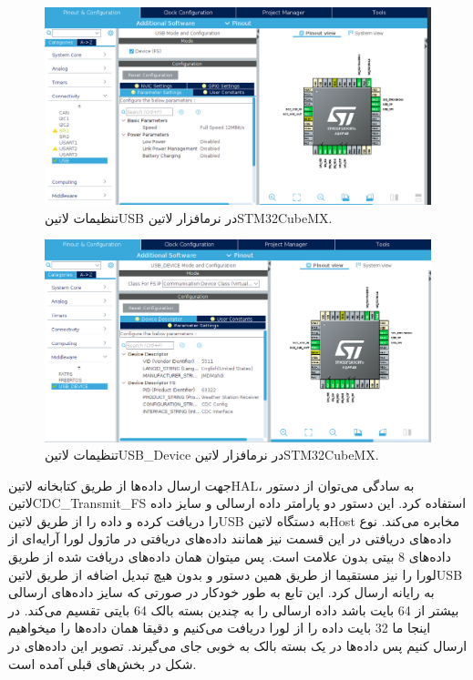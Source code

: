 \begin{figure}[H]
	\centering
	\includegraphics[width=\linewidth]{Assets/usb.png}
	\caption{تنظیمات ‌لاتین{USB} در نرمافزار ‌لاتین{STM32CubeMX}.}
	\label{fig:usb}
\end{figure}

\begin{figure}[H]
	\centering
	\includegraphics[width=\linewidth]{Assets/usb_device.png}
	\caption{تنظیمات ‌لاتین{USB\_Device}  در نرمافزار ‌لاتین{STM32CubeMX}.}
	\label{fig:usb_device}
\end{figure}

جهت ارسال داده‌ها از طریق کتابخانه ‌لاتین{HAL}، به سادگی می‌توان از دستور ‌لاتین{CDC\_Transmit\_FS} استفاده کرد. این دستور دو پارامتر داده‌ ارسالی و سایز داده را دریافت کرده و داده را از طریق ‌لاتین{USB} به دستگاه ‌لاتین{Host} مخابره می‌کند. نوع داده‌های دریافتی در این قسمت نیز همانند داده‌های دریافتی در ماژول لورا آرایه‌ای از داده‌های 8 بیتی بدون علامت است. پس میتوان همان داده‌های دریافت شده از طریق لورا را نیز مستقیما از طریق همین دستور و بدون هیچ تبدیل اضافه از طریق ‌لاتین{USB} به رایانه ارسال کرد. این تابع به طور خودکار در صورتی که سایز داده‌های ارسالی بیشتر از 64 بایت باشد داده ارسالی را به چندین بسته بالک 64 بایتی تقسیم می‌کند. در اینجا ما 32 بایت داده را از لورا دریافت می‌کنیم و دقیقا همان داده‌ها را میخواهیم ارسال کنیم پس داده‌ها در یک بسته بالک به خوبی جای می‌گیرند. تصویر این داده‌های در شکل  در بخش‌های قبلی آمده است.

